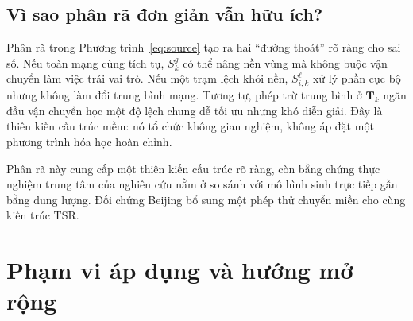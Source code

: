 \documentclass[10pt,a4paper]{article}
\newcommand{\modelname}{TSR}
\begin{document}
\subsection{Vì sao phân rã đơn giản vẫn hữu ích?}

Phân rã trong Phương trình~\eqref{eq:source} tạo ra hai ``đường thoát'' rõ ràng cho sai số. Nếu toàn mạng cùng tích tụ, $S^g_k$ có thể nâng nền vùng mà không buộc vận chuyển làm việc trái vai trò. Nếu một trạm lệch khỏi nền, $S^{\ell}_{i,k}$ xử lý phần cục bộ nhưng không làm đổi trung bình mạng. Tương tự, phép trừ trung bình ở $\bm{T}_k$ ngăn đầu vận chuyển học một độ lệch chung dễ tối ưu nhưng khó diễn giải. Đây là thiên kiến cấu trúc mềm: nó tổ chức không gian nghiệm, không áp đặt một phương trình hóa học hoàn chỉnh.

Phân rã này cung cấp một thiên kiến cấu trúc rõ ràng, còn bằng chứng thực nghiệm trung tâm của nghiên cứu nằm ở so sánh với mô hình sinh trực tiếp gần bằng dung lượng. Đối chứng Beijing bổ sung một phép thử chuyển miền cho cùng kiến trúc \modelname{}.

\section{Phạm vi áp dụng và hướng mở rộng}
\end{document}
